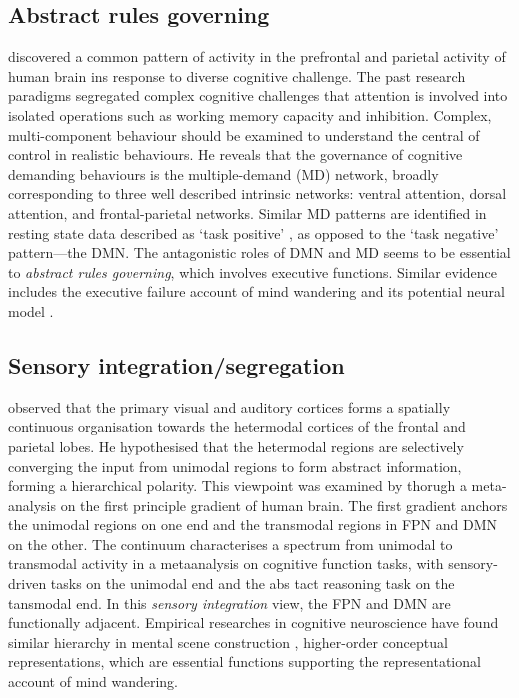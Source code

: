 \subsection{Abstract rules governing}
 discovered a common pattern of activity in the prefrontal and parietal activity of human brain ins response to diverse cognitive challenge. The past research paradigms segregated complex cognitive challenges that attention is involved into isolated operations such as working memory capacity and inhibition. Complex, multi-component behaviour should be examined to understand the central of control in realistic behaviours. He reveals that the governance of cognitive demanding behaviours is the multiple-demand (MD) network, broadly corresponding to three well described intrinsic networks: ventral attention, dorsal attention, and frontal-parietal networks. 
Similar MD patterns are identified in resting state data described as `task positive' \cite{Fox2005}, as opposed to the `task negative' pattern---the DMN. The antagonistic roles of DMN and MD seems to be essential to \textit{abstract rules governing}, which involves executive functions. Similar evidence includes the executive failure account of mind wandering \cite{McVay2012} and its potential neural model \cite{Weissman2006}. 

\subsection{Sensory integration/segregation}
 observed that the primary visual and auditory cortices forms a spatially continuous organisation towards the hetermodal cortices of the frontal and parietal lobes. He hypothesised that the hetermodal regions are selectively converging the input from unimodal regions to form abstract information, forming a hierarchical polarity. This viewpoint was examined by  thorugh a meta-analysis on the first principle gradient of human brain. The first gradient anchors the unimodal regions on one end and the transmodal regions in FPN and DMN on the other. The continuum characterises a spectrum from unimodal to transmodal activity in a metaanalysis on cognitive function tasks, with sensory-driven tasks on the unimodal end and the abs tact reasoning task on the tansmodal end. In this \textit{sensory integration} view, the FPN and DMN are functionally adjacent. Empirical researches in cognitive neuroscience have found similar hierarchy in mental scene construction \cite{Villena-Gonzalez2018}, higher-order conceptual representations\cite{Murphy2018}, which are essential functions supporting the representational account of mind wandering. 

